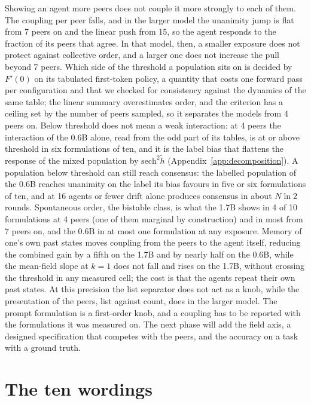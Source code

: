 \documentclass[11pt]{article}
\begin{document}
Showing an agent more peers does not couple it more strongly to each of them. The coupling per peer falls, and in the larger model the unanimity jump is flat from 7 peers on and the linear push from 15, so the agent responds to the fraction of its peers that agree. In that model, then, a smaller exposure does not protect against collective order, and a larger one does not increase the pull beyond 7 peers. Which side of the threshold a population sits on
is decided by $F'(0)$ on its tabulated first-token policy, a quantity that costs one
forward pass per configuration and that we checked for consistency against
the dynamics of the same table; the linear summary overestimates order, and
the criterion has a ceiling set by the number of peers sampled, so it
separates the models from 4 peers on. Below threshold does not mean a weak interaction: at 4 peers the interaction of the 0.6B alone, read from the odd part of its tables, is at or above threshold in six formulations of ten, and it is the label bias that flattens the response of the mixed population by $\mathrm{sech}^2\tilde h$ (Appendix~\ref{app:decomposition}). A population below threshold can still reach consensus: the labelled population of the 0.6B reaches unanimity on the
label its bias favours in five or six formulations of ten, and at 16
agents or fewer drift alone produces consensus in about $N\ln 2$ rounds. Spontaneous order, the bistable class, is what the 1.7B shows in 4 of 10 formulations at 4 peers (one of them marginal by construction) and in most from 7 peers on, and the 0.6B in at most one formulation at any exposure. Memory of one's own past
states moves coupling from the peers to the agent itself, reducing the
combined gain by a fifth on the 1.7B and by nearly half on the 0.6B, while
the mean-field slope at $k=1$ does not fall and rises on the 1.7B,
without crossing the threshold in any measured cell; the cost is that the agents repeat their own past states. At this precision the list separator does not act as a knob, while the presentation of the peers, list against count, does in the larger model. The prompt formulation is a first-order knob, and a coupling has to be reported with the formulations it was measured on. The next phase will add the field axis, a designed specification that competes with the peers, and the accuracy on a task with a ground truth.

\clearpage
\appendix
\section{The ten wordings}
\label{app:wordings}
\end{document}
